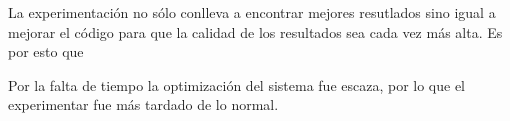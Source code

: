 \documentclass[a4paper]{article}
\begin{document}
La experimentaci\'on no s\'olo conlleva a encontrar mejores resutlados sino igual a mejorar el
c\'odigo para que la calidad de los resultados sea cada vez m\'as alta. Es por esto que

Por la falta de tiempo la optimización del sistema fue escaza, por lo que el experimentar fue m\'as
tardado de lo normal.


{}

\end{document}
